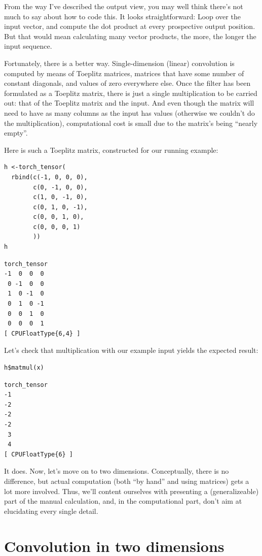 \documentclass[
  letterpaper,
]{krantz}
\begin{document}
From the way I've described the output view, you may well think there's
not much to say about how to code this. It looks straightforward: Loop
over the input vector, and compute the dot product at every prospective
output position. But that would mean calculating many vector products,
the more, the longer the input sequence.

Fortunately, there is a better way. Single-dimension (linear)
convolution is computed by means of Toeplitz matrices, matrices that
have some number of constant diagonals, and values of zero everywhere
else. Once the filter has been formulated as a Toeplitz matrix, there is
just a single multiplication to be carried out: that of the Toeplitz
matrix and the input. And even though the matrix will need to have as
many columns as the input has values (otherwise we couldn't do the
multiplication), computational cost is small due to the matrix's being
``nearly empty''.

Here is such a Toeplitz matrix,
constructed for our running example:

\begin{verbatim}
h <-torch_tensor(
  rbind(c(-1, 0, 0, 0),
        c(0, -1, 0, 0),
        c(1, 0, -1, 0),
        c(0, 1, 0, -1),
        c(0, 0, 1, 0),
        c(0, 0, 0, 1)
        ))
h
\end{verbatim}

\begin{verbatim}
torch_tensor
-1  0  0  0
 0 -1  0  0
 1  0 -1  0
 0  1  0 -1
 0  0  1  0
 0  0  0  1
[ CPUFloatType{6,4} ]
\end{verbatim}

Let's check that multiplication with our example input yields the
expected result:

\begin{verbatim}
h$matmul(x)
\end{verbatim}

\begin{verbatim}
torch_tensor
-1
-2
-2
-2
 3
 4
[ CPUFloatType{6} ]
\end{verbatim}

It does. Now, let's move on to two dimensions. Conceptually, there is no
difference, but actual computation (both ``by hand'' and using matrices)
gets a lot more involved. Thus, we'll content ourselves with presenting
a (generalizeable) part of the manual calculation, and, in the
computational part, don't aim at elucidating every single detail.

\hypertarget{convolution-in-two-dimensions}{%
\section{Convolution in two
dimensions}\label{convolution-in-two-dimensions}}
\end{document}
